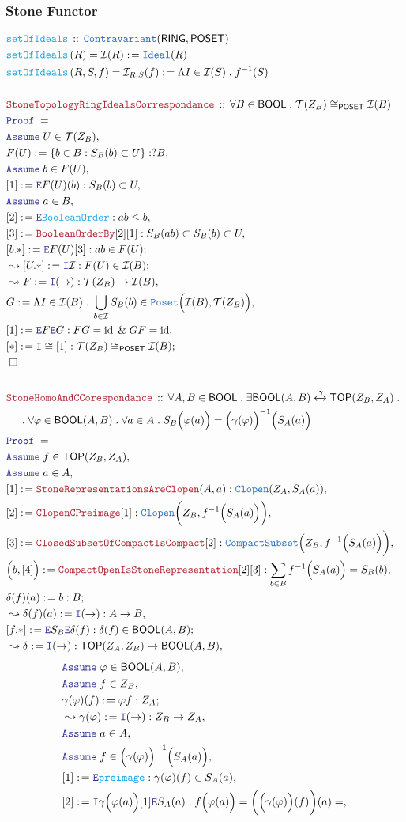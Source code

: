\documentclass[12pt]{scrartcl}
\newcommand{\TYPE}[1]{\textcolor{NavyBlue}{\mathtt{#1}}}
\newcommand{\FUNC}[1]{\textcolor{Cerulean}{\mathtt{#1}}}
\newcommand{\LOGIC}[1]{\textcolor{Blue}{\mathtt{#1}}}
\newcommand{\THM}[1]{\textcolor{Maroon}{\mathtt{#1}}}
\renewcommand{\.}{\; . \;}
\newcommand{\de}{: \kern 0.1pc =}
\newcommand{\Act}[1]{\left( #1 \right)}
\newcommand{\Theorem}[2]{& \THM{#1} \, :: \, #2 \\ & \Proof = \\ }
\newcommand{\DeclareFunc}[2]{& \FUNC{#1} \, :: \, #2 \\}
\newcommand{\DefineNamedFunc}[4]{&  \FUNC{#1}\Act{#2} = #3 \de #4 \\}
\newcommand{\NewLine}{\\ & \kern 1pc}
\newcommand{\Page}[1]{ \begin{align*} #1 \end{align*}   }
\renewcommand{\And}{\; \& \;}
\newcommand{\Intro}{\LOGIC{I}}
\newcommand{\Elim}{\LOGIC{E}}
\DeclareMathOperator*{\id}{id}
\newcommand{\ToIso}{\xleftrightarrow}
\newcommand{\Say}[3]{& #1 \de #2 : #3, \\}
\newcommand{\SayIn}[3]{& #1 \de #2 \in #3, \\}
\newcommand{\Conclude}[3]{& #1 \de #2 : #3; \\}
\newcommand{\Derive}[3]{& \leadsto #1 \de #2 : #3, \\}
\newcommand{\DeriveConclude}[3]{& \leadsto #1 \de #2 : #3 ; \\}
\newcommand{\AssumeIn}[2]{& \LOGIC{Assume} \; #1 \in #2, \\}
\newcommand{\QED}{\; \square}
\newcommand{\EndProof}{& \QED \\}
\newcommand{\Proof}{\LOGIC{Proof} \; }
\newcommand{\Ideal}{\TYPE{Ideal}}
\newcommand{\Contra}{\TYPE{Contravariant}}
\newcommand{\I}{\mathcal{I}}
\newcommand{\Poset}{\TYPE{Poset}}
\newcommand{\POSET}{\mathsf{POSET}}
\newcommand{\RING}{\mathsf{RING}}
\newcommand{\Compacts}{\TYPE{CompactSubset}}
\newcommand{\Clopen}{\TYPE{Clopen}}
\newcommand{\TOP}{\mathsf{TOP}}
\newcommand{\T}{\mathcal{T}}
\newcommand{\BOOL}{\mathsf{BOOL}}
\begin{document}
\subsubsection{Stone Functor}
\Page{
	\DeclareFunc{setOfIdeals}{\Contra(\RING,\POSET)}
	\DefineNamedFunc{setOfIdeals}{R}{\I(R)}{\Ideal(R)}
	\DefineNamedFunc{setOfIdeals}{R,S,f}{\I_{R,S}(f)}{\Lambda I \in \I(S) \. f^{-1}(S)}
	\\
	\Theorem{StoneTopologyRingIdealsCorrespondance}
	{
		\forall B \in \BOOL \.
		\T(Z_B) \cong_\POSET \I(B)
	}
	\AssumeIn{U}{\T(Z_B)}
	\Say{F(U)}{\{ b \in B : S_B(b) \subset U   \}}{?B}
	\AssumeIn{b}{F(U)}
	\Say{[1]}{\Elim F(U)(b)}{S_B(b) \subset U}
	\AssumeIn{a}{B}
	\Say{[2]}{\Elim \FUNC{BooleanOrder}}{ab \le b}
	\Say{[3]}{\THM{BooleanOrderBy}[2][1] }{ S_B(ab) \subset S_B(b) \subset U }
	\Conclude{[b.*]}{\Elim F(U)[3]}{ab \in F(U)}
	\DeriveConclude{[U.*]}{\Intro \I}{F(U) \in \I(B)}
	\Derive{F}{\Intro(\to)}{\T(Z_B) \to \I(B)}
	\SayIn{G}{\Lambda I \in  \I(B) \. \bigcup_{b \in \I} S_B(b)}{\Poset\Big(\I(B),  \T(Z_B)\Big)} 
	\Say{[1]}{\Elim F \Elim G}{FG = \id \And GF = \id}
	\Conclude{[*]}{\Intro \cong [1]}{\T(Z_B) \cong_\POSET \I(B)}
	\EndProof
	\\
	\Theorem{StoneHomoAndCCorespondance}
	{
		\forall A,B \in \BOOL \.
		\exists \BOOL(A,B) \ToIso{\gamma} \TOP(Z_B,Z_A)  \.
		\NewLine \.
		\forall \varphi \in \BOOL(A,B) \.
		\forall a \in A \. 
		S_B\Big( \varphi(a) \Big) = \Big(\gamma(\varphi)\Big)^{-1}\Big( S_A(a) \Big)
	}
	\AssumeIn{f}{\TOP(Z_B,Z_A)}
	\AssumeIn{a}{A}
	\Say{[1]}{\THM{StoneRepresentationsAreClopen}(A,a)}
	{\Clopen(Z_A,S_A(a))}
	\Say{[2]}{\THM{ClopenCPreimage}[1]}
	{
		\Clopen\bigg(Z_B, f^{-1}\Big(S_A(a)\Big) \bigg)
	}
	\Say{[3]}{\THM{ClosedSubsetOfCompactIsCompact}[2]}
	{
		\Compacts\Big( Z_B, f^{-1}\Big(S_A(a)\Big) \bigg)
	}
	\Say{\Big(b,[4] \Big)}{\THM{CompactOpenIsStoneRepresentation}[2][3]}
	{
		\sum_{b \in B} f^{-1}\Big( S_A(a)\Big) = S_B(b)
	}
	\Conclude{\delta(f)(a)}{b}{B}
	\Derive{\delta(f)(a)}{\Intro(\to)}{A \to B}
	\Conclude{[f.*]}{\Elim S_B \Elim \delta(f)}{\delta(f) \in \BOOL(A,B)}
	\Derive{\delta}{\Intro(\to)}{\TOP(Z_A,Z_B) \to \BOOL(A,B)}
}\Page{
	\AssumeIn{\varphi}{\BOOL(A,B)}
	\AssumeIn{f}{Z_B}
	\Conclude{\gamma(\varphi)(f)}{\varphi f}{Z_A}
	\Derive{\gamma(\varphi)}{\Intro(\to)}{Z_B \to Z_A}
	\AssumeIn{a}{A}
	\AssumeIn{f}{ \Big(\gamma(\varphi)\Big)^{-1} \Big( S_A(a) \Big)  }
	\Say{[1]}{\Elim \FUNC{preimage}}{\gamma(\varphi)(f) \in S_A(a)}
	\Say{[2]}{\Intro \gamma\Big( \varphi(a) \Big)[1] \Elim S_A(a)}
	{
		f\Big( \varphi(a) \Big) =
		\bigg(\Big(\gamma(\varphi)\Big)(f)\bigg)(a) =
}}
\end{document}

